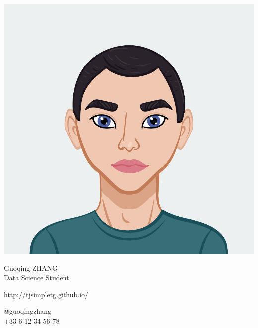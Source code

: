 \documentclass{article}
\begin{document}
\centering \includegraphics[width=.25\linewidth]{logo}\\[3pt]
\parbox{2in}{\Large \centering Guoqing ZHANG\\[1pt]
\normalsize Data Science Student}

\vfill
\raggedright
\begin{multicols}{2}
http://tjsimpletg.github.io/

\columnbreak
\raggedleft
@guoqingzhang\\
+33 6 12 34 56 78%
\end{multicols}%
\end{document}

